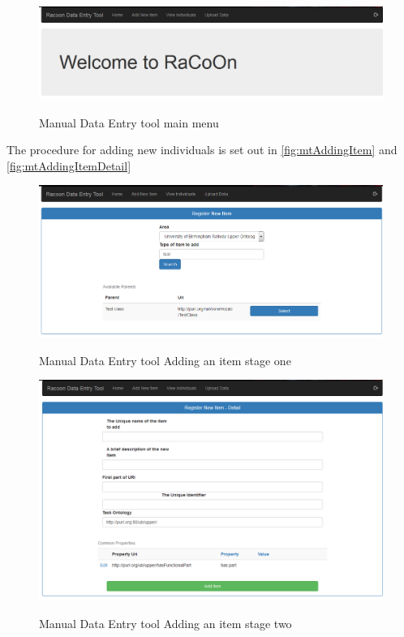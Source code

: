  \begin{figure}[!h]
\myfloatalign
{\includegraphics[max height=0.5\textheight,max width=\linewidth]{gfx/manToolInUse}} 
\caption{Manual Data Entry tool main menu}
\label{fig:mtMainMenu}
\end{figure}

The procedure for adding new individuals is set out in \autoref{fig:mtAddingItem} and \autoref{fig:mtAddingItemDetail}

 \begin{figure}[!h]
\myfloatalign
{\includegraphics[max height=0.5\textheight,max width=\linewidth]{gfx/manToolAddingItem}} 
\caption{Manual Data Entry tool Adding an item stage one}
\label{fig:mtAddingItem}
\end{figure}

 \begin{figure}[!h]
\myfloatalign
{\includegraphics[max height=0.5\textheight,max width=\linewidth]{gfx/addItemDetail}} 
\caption{Manual Data Entry tool Adding an item stage two}
\label{fig:mtAddingItemDetail}
\end{figure}


